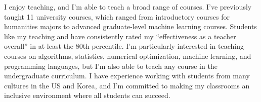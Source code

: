 \documentclass[12pt]{article}
\begin{document}


\noindent
I enjoy teaching,
and I'm able to teach a broad range of courses.
I've previously taught 11 university courses,
which ranged from introductory courses for humanities majors to advanced graduate-level machine learning courses.
Students like my teaching and have consistently rated my ``effectiveness as a teacher overall'' in at least the 80th percentile.
I'm particularly interested in teaching courses on algorithms, statistics, numerical optimization, machine learning, and programming languages,
but I'm also able to teach any course in the undergraduate curriculum.
I have experience working with students from many cultures in the US and Korea,
and I'm committed to making my classrooms an inclusive environment where all students can succeed.
\end{document}
